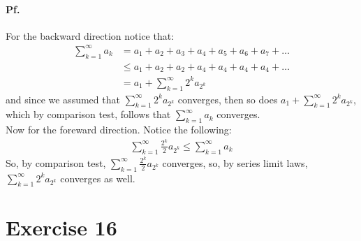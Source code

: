 \documentclass[11pt]{article}
\begin{document}
\paragraph{Pf.}
For the backward direction notice that:
\begin{align*}
	\sum\limits_{k=1}^{\infty}a_k &= a_1 + a_2 + a_3 + a_4 + a_5 + a_6 + a_7 + \dots\\
	&\leq a_1 + a_2 + a_2 + a_4 + a_4 + a_4 + a_4 + \dots\\
	&= a_1 + \sum\limits_{k=1}^{\infty}2^k a_{2^k}
\end{align*}
and since we assumed that $ \sum\limits_{k=1}^{\infty}2^k a_{2^k}$ converges, then so does $a_1 + \sum\limits_{k=1}^{\infty}2^k a_{2^k}$, which by comparison test, follows that $\sum\limits_{k=1}^{\infty}a_k$ converges.\\
Now for the foreward direction. Notice the following:
\begin{align*}
	\sum\limits_{k=1}^{\infty}\frac{2^k}{2}{a_{2^k}} \leq \sum\limits_{k=1}^{\infty}a_k
\end{align*}
So, by comparison test, $\sum\limits_{k=1}^{\infty}\frac{2^k}{2}a_{2^k}$ converges, so, by series limit laws, $\sum\limits_{k=1}^{\infty}2^k a_{2^k}$ converges as well.

\section*{Exercise 16}
\end{document}

